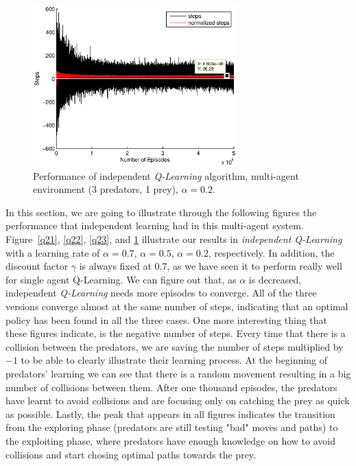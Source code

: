 \documentclass[a4paper,11pt]{article}
\begin{document}
~
\begin{figure}[ht!]
  \centering
	\includegraphics[width=0.7\textwidth]{figures/iq3.eps}
    \caption{Performance of independent \textit{Q-Learning} algorithm, multi-agent environment (3 predators, 1 prey), $\alpha = 0.2$.}
    \label{q33}
\end{figure}

In this section, we are going to illustrate through the following figures the performance that independent learning had in this multi-agent system. 
Figure~\ref{q21}, \ref{q22}, \ref{q23}, and \ref{q33} illustrate our results in \textit{independent Q-Learning} with a learning rate of $\alpha = 0.7$, $\alpha = 0.5$, $\alpha = 0.2$, respectively. In addition, the discount factor $\gamma$ is always fixed at $0.7$, as we have seen it to perform really well for single agent Q-Learning. We can figure out that, as $\alpha$ is decreased, independent \textit{Q-Learning} needs more episodes to converge. All of the three versions converge almost at the same number of steps, indicating that an optimal policy has been found in all the three cases.   
One more interesting thing that these figures indicate, is the negative number of steps. Every time that there is a collision between the predators, we are saving the number of steps multiplied by $-1$ to be able to clearly illustrate their learning process. At the beginning of predators' learning we can see that there is a random movement resulting in a big number of collisions between them. After one thousand episodes, the predators have learnt to avoid collisions and are focusing only on catching the prey as quick as possible. Lastly, the peak that appears in all figures indicates the transition from the exploring phase (predators are still testing "bad" moves and paths) to the exploiting phase, where predators have enough knowledge on how to avoid collisions and start chosing optimal paths towards the prey.
\end{document}
